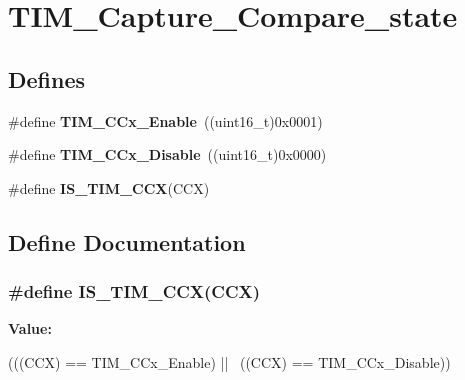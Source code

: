 \hypertarget{group__TIM__Capture__Compare__state}{
\section{TIM\_\-Capture\_\-Compare\_\-state}
\label{group__TIM__Capture__Compare__state}
}
\subsection*{Defines}
\begin{DoxyCompactItemize}
\item 
\hypertarget{group__TIM__Capture__Compare__state_ga6acaeb60dad50ce9799ae9f62ed7719a}{
\#define {\bfseries TIM\_\-CCx\_\-Enable}~((uint16\_\-t)0x0001)}
\label{group__TIM__Capture__Compare__state_ga6acaeb60dad50ce9799ae9f62ed7719a}

\item 
\hypertarget{group__TIM__Capture__Compare__state_gaa1441f66393b9daa9f97efb29b364cd3}{
\#define {\bfseries TIM\_\-CCx\_\-Disable}~((uint16\_\-t)0x0000)}
\label{group__TIM__Capture__Compare__state_gaa1441f66393b9daa9f97efb29b364cd3}

\item 
\#define {\bfseries IS\_\-TIM\_\-CCX}(CCX)
\end{DoxyCompactItemize}


\subsection{Define Documentation}
\hypertarget{group__TIM__Capture__Compare__state_ga5b7461e8c9c25f6fa082118c95b02ba1}{
\subsubsection[{IS\_\-TIM\_\-CCX}]{\setlength{\rightskip}{0pt plus 5cm}\#define IS\_\-TIM\_\-CCX(CCX)}}
\label{group__TIM__Capture__Compare__state_ga5b7461e8c9c25f6fa082118c95b02ba1}
{\bfseries Value:}
\begin{DoxyCode}
(((CCX) == TIM_CCx_Enable) || \
                         ((CCX) == TIM_CCx_Disable))
\end{DoxyCode}
